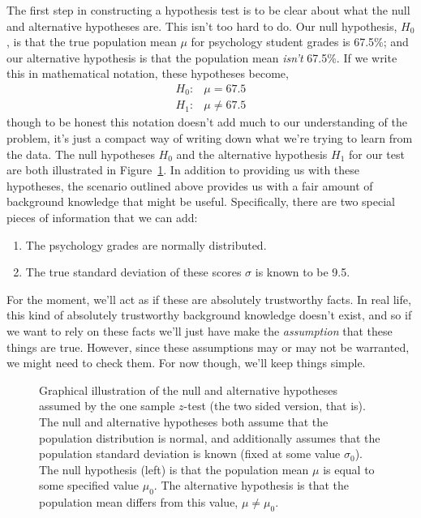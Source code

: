 The first step in constructing a hypothesis test is to be clear about what the null and alternative hypotheses are. This isn't too hard to do. Our null hypothesis, $H_0$, is that the true population mean $\mu$ for psychology student grades is 67.5\%; and our alternative hypothesis is that the population mean {\it isn't} 67.5\%. If we write this in mathematical notation, these hypotheses become,
$$
\begin{array}{ll}
H_0: & \mu = 67.5 \\
H_1: & \mu \neq 67.5
\end{array}
$$
though to be honest this notation doesn't add much to our understanding of the problem, it's just a compact way of writing down what we're trying to learn from the data. The null hypotheses $H_0$ and the alternative hypothesis $H_1$ for our test are both illustrated in Figure~\ref{fig:ztesthyp}. In addition to providing us with these hypotheses, the scenario outlined above provides us with a fair amount of background knowledge that might be useful. Specifically, there are two special pieces of information that we can add:
\begin{enumerate}
\item The psychology grades are normally distributed.
\item The true standard deviation of these scores $\sigma$ is known to be 9.5.
\end{enumerate}
For the moment, we'll act as if these are absolutely trustworthy facts. In real life, this kind of absolutely trustworthy background knowledge doesn't exist, and so if we want to rely on these facts we'll just have make the {\it assumption} that these things are true. However, since these assumptions may or may not be warranted, we might need to check them. For now though, we'll keep things simple.


\begin{figure}
\begin{center}
\caption{Graphical illustration of the null and alternative hypotheses assumed by the one sample $z$-test (the two sided version, that is). The null and alternative hypotheses both assume that the population distribution is normal, and additionally assumes that the population standard deviation is known (fixed at some value $\sigma_0$). The null hypothesis (left) is that the population mean $\mu$ is equal to some specified value $\mu_0$. The alternative hypothesis is that the population mean differs from this value, $\mu \neq \mu_0$.}
\HR
\label{fig:ztesthyp}
\end{center}
\end{figure}




